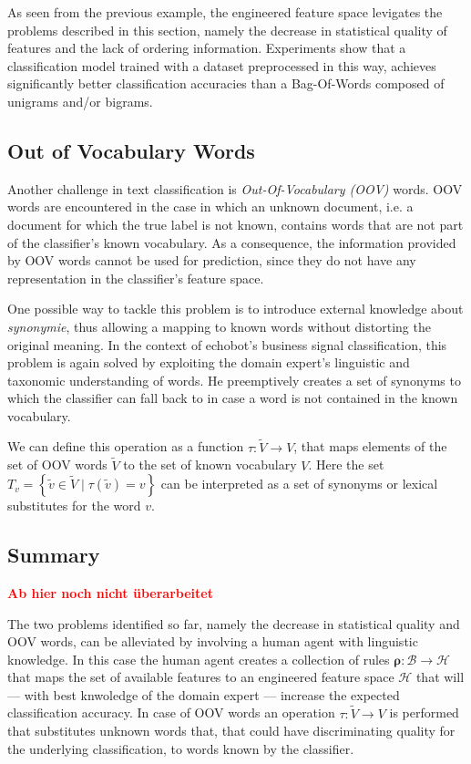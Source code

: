 As seen from the previous example, the engineered feature space levigates the
problems described in this section, namely the decrease in statistical quality of
features and the lack of ordering information. Experiments show that a
classification model trained with a dataset preprocessed in this way, achieves significantly 
better classification accuracies than a Bag-Of-Words composed of unigrams and/or
bigrams.

\subsection{Out of Vocabulary Words}
\label{sec:problem-statement}

Another challenge in text classification is \emph{Out-Of-Vocabulary (OOV)} 
words. OOV words are encountered in the case in which an unknown document, i.e.
a document for which the true label is not known,
contains words that are not part of the classifier's known vocabulary. 
As a consequence, the information provided by OOV words cannot be used for
prediction, since they do not have any representation in the classifier's feature 
space. 

One possible way to tackle this problem is to introduce external knowledge about
\textit{synonymie}, thus allowing a mapping to known words without distorting
the original meaning.
In the context of echobot's business signal classification, this problem is again 
solved by exploiting the domain expert's linguistic and taxonomic understanding
of words. He preemptively creates a set of synonyms to which the classifier can
fall back to in case a word is not contained in the known vocabulary.

We can define this operation as a function $\tau: \tilde{V} \to V$, that
maps elements of the set of OOV words $\tilde{V}$ to the set of known
vocabulary $V$. Here the set $T_v = \left\{ \tilde{v} \in \tilde{V} \mid
\tau(\tilde{v})=v \right\} $ can be interpreted as a set of synonyms or lexical
substitutes for the word $v$.


\subsection{Summary}

\textcolor{red}{\textbf{Ab hier noch nicht überarbeitet}}

The two problems identified so far, namely the decrease in
statistical quality and OOV words, can be alleviated by involving a human agent
with linguistic knowledge.
In this case the human agent creates a collection of rules $\boldsymbol\rho:
\mathcal{B} \to \mathcal{H}$ that maps the set of available features to an engineered
feature space $\mathcal{H}$ that will --- with best knwoledge of the domain
expert --- increase the expected classification accuracy. In case of OOV words
an operation $\tau: \tilde{V} \to V$ is performed that substitutes unknown words
that, that could have discriminating quality for the underlying classification, to words known by
the classifier. 


